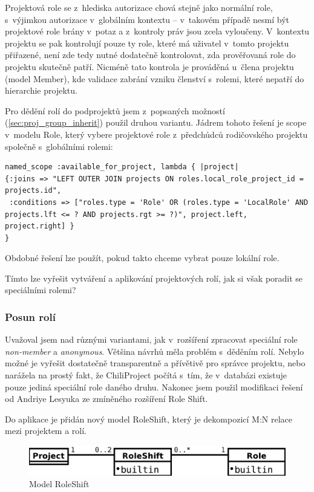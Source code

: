\documentclass[thesis=B,czech]{FITthesis}[2012/05/02]
\begin{document}
Projektová role se z~hlediska autorizace chová stejně jako normální
role, s~výjimkou autorizace v~globálním kontextu -- v~takovém případě
nesmí být projektové role brány v~potaz a z~kontroly práv jsou zcela
vyloučeny. V~kontextu projektu se pak kontrolují pouze ty role, které má
uživatel v~tomto projektu přiřazené, není zde tedy nutné dodatečně
kontrolovat, zda prověřovaná role do projektu skutečně patří. Nicméně
tato kontrola je prováděná u~člena projektu (model Member), kde validace
zabrání vzniku členství s~rolemi, které nepatří do hierarchie projektu.

Pro dědění rolí do podprojektů jsem z~popsaných možností
(\ref{sec:proj_group_inherit}) použil druhou variantu. Jádrem tohoto
řešení je \gls{scope} v~modelu Role, který vybere projektové role
z~předchůdců rodičovského projektu společně s~globálními rolemi:

\begin{lstlisting}
named_scope :available_for_project, lambda { |project|
{:joins => "LEFT OUTER JOIN projects ON roles.local_role_project_id = projects.id",
 :conditions => ["roles.type = 'Role' OR (roles.type = 'LocalRole' AND projects.lft <= ? AND projects.rgt >= ?)", project.left, project.right] }
}
\end{lstlisting}
Obdobné řešení lze použít, pokud takto chceme vybrat pouze lokální role.

Tímto lze vyřešit vytváření a aplikování projektových rolí, jak si však
poradit se speciálními rolemi?

\subsubsection{Posun rolí}

Uvažoval jsem nad různými variantami, jak v~rozšíření zpracovat speciální
role \emph{non-member} a \emph{anonymous}. Většina návrhů měla problém
s~děděním rolí. Nebylo možné je vyřešit dostatečně transparentně a
přívětivě pro správce projektu, nebo narážela na prostý fakt, že
ChiliProject počítá s~tím, že v~databázi existuje pouze jediná speciální
role daného druhu. Nakonec jsem použil modifikaci řešení od Andriye
Lesyuka ze zmíněného rozšíření Role Shift.

Do aplikace je přidán nový model RoleShift, který je dekompozicí M:N
relace mezi projektem a rolí.

\begin{figure}[htbp]
\centering
\includegraphics[width=1\textwidth]{role-er2.pdf}
\caption{Model RoleShift}
\end{figure}
\end{document}
